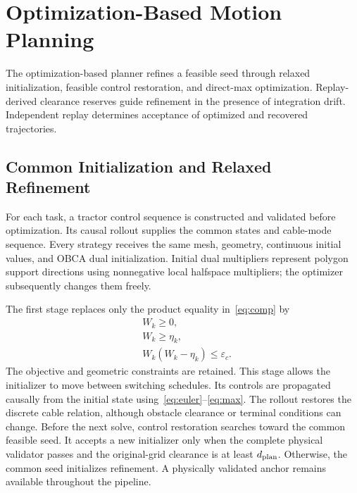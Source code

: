 \section{Optimization-Based Motion Planning}
The optimization-based planner refines a feasible seed through relaxed initialization, feasible control restoration, and direct-max optimization. Replay-derived clearance reserves guide refinement in the presence of integration drift. Independent replay determines acceptance of optimized and recovered trajectories.

\subsection{Common Initialization and Relaxed Refinement}
For each task, a tractor control sequence is constructed and validated before optimization. Its causal rollout supplies the common states and cable-mode sequence. Every strategy receives the same mesh, geometry, continuous initial values, and OBCA dual initialization. Initial dual multipliers represent polygon support directions using nonnegative local halfspace multipliers; the optimizer subsequently changes them freely.

The first stage replaces only the product equality in~\eqref{eq:comp} by
\begin{equation}\begin{aligned}
 &W_k\geq0,\\
 &W_k\geq\eta_k,\\
 &W_k(W_k-\eta_k)\leq\varepsilon_c.
\end{aligned}\label{eq:relax}\end{equation}
The objective and geometric constraints are retained. This stage allows the initializer to move between switching schedules. Its controls are propagated causally from the initial state using~\eqref{eq:euler}--\eqref{eq:max}. The rollout restores the discrete cable relation, although obstacle clearance or terminal conditions can change. Before the next solve, control restoration searches toward the common feasible seed. It accepts a new initializer only when the complete physical validator passes and the original-grid clearance is at least $d_{\rm plan}$. Otherwise, the common seed initializes refinement. A physically validated anchor remains available throughout the pipeline.

